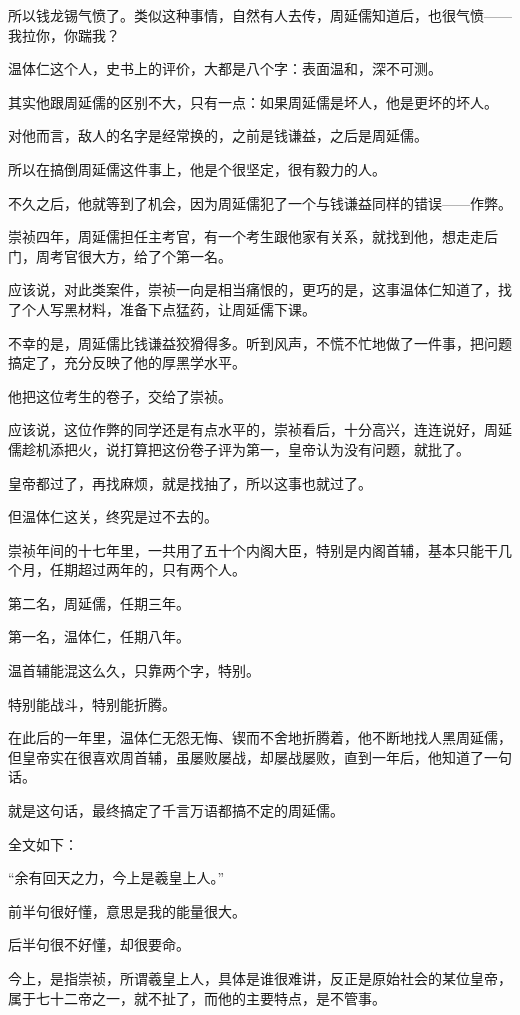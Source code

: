 \begin{multicols}{\theparacolNo}
所以钱龙锡气愤了。类似这种事情，自然有人去传，周延儒知道后，也很气愤——我拉你，你踹我？

温体仁这个人，史书上的评价，大都是八个字：表面温和，深不可测。

其实他跟周延儒的区别不大，只有一点：如果周延儒是坏人，他是更坏的坏人。

对他而言，敌人的名字是经常换的，之前是钱谦益，之后是周延儒。

所以在搞倒周延儒这件事上，他是个很坚定，很有毅力的人。

不久之后，他就等到了机会，因为周延儒犯了一个与钱谦益同样的错误——作弊。

崇祯四年，周延儒担任主考官，有一个考生跟他家有关系，就找到他，想走走后门，周考官很大方，给了个第一名。

应该说，对此类案件，崇祯一向是相当痛恨的，更巧的是，这事温体仁知道了，找了个人写黑材料，准备下点猛药，让周延儒下课。

不幸的是，周延儒比钱谦益狡猾得多。听到风声，不慌不忙地做了一件事，把问题搞定了，充分反映了他的厚黑学水平。

他把这位考生的卷子，交给了崇祯。

应该说，这位作弊的同学还是有点水平的，崇祯看后，十分高兴，连连说好，周延儒趁机添把火，说打算把这份卷子评为第一，皇帝认为没有问题，就批了。

皇帝都过了，再找麻烦，就是找抽了，所以这事也就过了。

但温体仁这关，终究是过不去的。

崇祯年间的十七年里，一共用了五十个内阁大臣，特别是内阁首辅，基本只能干几个月，任期超过两年的，只有两个人。

第二名，周延儒，任期三年。

第一名，温体仁，任期八年。

温首辅能混这么久，只靠两个字，特别。

特别能战斗，特别能折腾。

在此后的一年里，温体仁无怨无悔、锲而不舍地折腾着，他不断地找人黑周延儒，但皇帝实在很喜欢周首辅，虽屡败屡战，却屡战屡败，直到一年后，他知道了一句话。

就是这句话，最终搞定了千言万语都搞不定的周延儒。

全文如下：

“余有回天之力，今上是羲皇上人。”

前半句很好懂，意思是我的能量很大。

后半句很不好懂，却很要命。

今上，是指崇祯，所谓羲皇上人，具体是谁很难讲，反正是原始社会的某位皇帝，属于七十二帝之一，就不扯了，而他的主要特点，是不管事。


\end{multicols}
